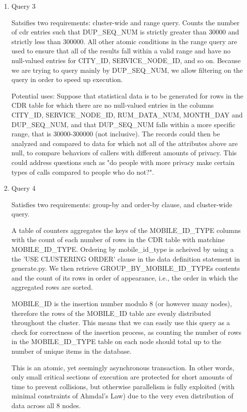 \documentclass[letterpaper]{article}
\begin{document}
\begin{enumerate}
	\item Query 3
		

		Satsifies two requirements: cluster-wide and range query. Counts the number of cdr
		entries such that DUP\_SEQ\_NUM is strictly greater than 30000 and strictly less than
		300000. All other atomic conditions in the range query are used to ensure that
		all of the results fall within a valid range and have no null-valued entries for
		CITY\_ID, SERVICE\_NODE\_ID, and so on. Because we are trying to query mainly by 
		DUP\_SEQ\_NUM, we allow filtering on the query in order to speed up execution.

		Potential uses: Suppose that statistical data is to be generated for rows in the
		CDR table for which there are no null-valued entries in the columns CITY\_ID,
		SERVICE\_NODE\_ID, RUM\_DATA\_NUM, MONTH\_DAY and DUP\_SEQ\_NUM, and that DUP\_SEQ\_NUM
		falls within a more specific range, that is 30000-300000 (not inclusive). The
		records could then be analyzed and compared to data for which not all of the
		attributes above are null, to compare behaviors of callers with different amounts
		of privacy. This could address questions such as "do people with more privacy make
		certain types of calls compared to people who do not?".

	\item Query 4
		

		Satisfies two requirements: group-by and order-by clause, and cluster-wide query.

		A table of counters aggregates the keys of the MOBILE\_ID\_TYPE columns with the 
		count of each number of rows in the CDR table with matchine MOBILE\_ID\_TYPE.
		Ordering by mobile\_id\_type is acheived by using a the 'USE CLUSTERING ORDER' 
		clause in the data definition statement in generate.py.
		We then retrieve GROUP\_BY\_MOBILE\_ID\_TYPEs contents and the count of its rows
		in order of appearance, i.e., the order in which the aggregated rows are sorted.

		MOBILE\_ID is the insertion number modulo 8 (or however many nodes), therefore
		the rows of the MOBILE\_ID table are evenly distributed throughout the cluster.
		This means that we can easily use this query as a check for correctness of
		the insertion process, as counting the number of rows in the MOBILE\_ID\_TYPE table
		on each node should total up to the number of unique items in the database.

		This is an atomic, yet seemingly asynchronous transaction. In other words, only
		small critical sections of execution are protected for short amounts of time
		to prevent collisions, but otherwise parallelism is fully exploited (with minimal
		constraints of Ahmdal's Law) due to the very even distribution of data across all 
		8 nodes. 


\end{enumerate}
\end{document}

